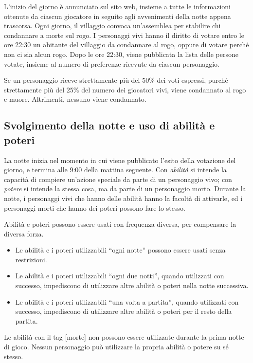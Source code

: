 \documentclass[a4paper,10pt]{article}
\begin{document}
L'inizio del giorno è annunciato sul sito web, insieme a tutte le informazioni ottenute da ciascun giocatore in seguito agli avvenimenti della notte appena trascorsa. Ogni giorno, il villaggio convoca un'assemblea per stabilire chi condannare a morte sul rogo. I personaggi vivi hanno il diritto di votare entro le ore 22:30 un abitante del villaggio da condannare al rogo, oppure di votare perché non ci sia alcun rogo. Dopo le ore 22:30, viene pubblicata la lista delle persone votate, insieme al numero di preferenze ricevute da ciascun personaggio.

Se un personaggio riceve strettamente più del 50\% dei voti espressi, purché strettamente più del 25\% del numero dei giocatori vivi, viene condannato al rogo e muore. Altrimenti, nessuno viene condannato.

\subsection{Svolgimento della notte e uso di abilità e poteri}

La notte inizia nel momento in cui viene pubblicato l'esito della votazione del giorno, e termina alle 9:00 della mattina seguente. Con \emph{abilità} si intende la capacità di compiere un'azione speciale da parte di un personaggio vivo; con \emph{potere} si intende la stessa cosa, ma da parte di un personaggio morto. Durante la notte, i personaggi vivi che hanno delle abilità hanno la facoltà di attivarle, ed i personaggi morti che hanno dei poteri possono fare lo stesso.

Abilità e poteri possono essere usati con frequenza diversa, per compensare la diversa forza.
\begin{itemize}
      \item Le abilità e i poteri utilizzabili ``ogni notte'' possono essere usati senza restrizioni.
      \item Le abilità e i poteri utilizzabili ``ogni due notti'', quando utilizzati con successo, impediscono di utilizzare altre abilità o poteri nella notte successiva.
      \item Le abilità e i poteri utilizzabili ``una volta a partita'', quando utilizzati con successo, impediscono di utilizzare altre abilità o poteri per il resto della partita.
\end{itemize}

Le abilità con il tag [morte] non possono essere utilizzate durante la prima notte di gioco. Nessun personaggio può utilizzare la propria abilità o potere su sé stesso.
\end{document}
